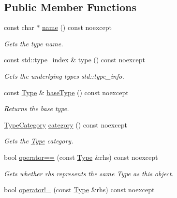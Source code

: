 \subsection*{Public Member Functions}
\begin{DoxyCompactItemize}
\item 
const char $\ast$ \hyperlink{classdg_1_1deepcore_1_1_type_afbf3ce3511318a804bff5f387dde55bb}{name} () const noexcept
\begin{DoxyCompactList}\small\item\em Gets the type name. \end{DoxyCompactList}\item 
const std\+::type\+\_\+index \& \hyperlink{classdg_1_1deepcore_1_1_type_a7448319c8cbc7f913a5e054f5aaba8ed}{type} () const noexcept
\begin{DoxyCompactList}\small\item\em Gets the underlying type\textquotesingle{}s {\ttfamily std\+::type\+\_\+info}. \end{DoxyCompactList}\item 
const \hyperlink{classdg_1_1deepcore_1_1_type}{Type} \& \hyperlink{classdg_1_1deepcore_1_1_type_a89351963b1ac286ebbabfd5ed5a9be31}{base\+Type} () const noexcept
\begin{DoxyCompactList}\small\item\em Returns the base type. \end{DoxyCompactList}\item 
\hyperlink{group___process_type_ga7df7aa6573baa85be9bbbf9b5916f038}{Type\+Category} \hyperlink{classdg_1_1deepcore_1_1_type_a3143689119d10d57f94b41bfb5bca1e2}{category} () const noexcept
\begin{DoxyCompactList}\small\item\em Gets the \hyperlink{classdg_1_1deepcore_1_1_type}{Type} category. \end{DoxyCompactList}\item 
bool \hyperlink{classdg_1_1deepcore_1_1_type_ab0872208343650ced69584fdba040ed0}{operator==} (const \hyperlink{classdg_1_1deepcore_1_1_type}{Type} \&rhs) const noexcept
\begin{DoxyCompactList}\small\item\em Gets whether {\ttfamily rhs} represents the same \hyperlink{classdg_1_1deepcore_1_1_type}{Type} as this object. \end{DoxyCompactList}\item 
bool \hyperlink{classdg_1_1deepcore_1_1_type_a110a62ff965795aa926efc962729c0b0}{operator!=} (const \hyperlink{classdg_1_1deepcore_1_1_type}{Type} \&rhs) const noexcept

\end{DoxyCompactItemize}
